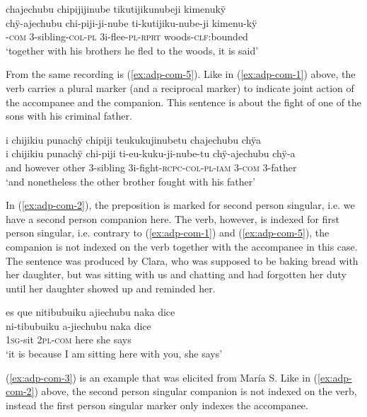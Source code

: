 \ea\label{ex:adp-com-1}
\begingl
\glpreamble chajechubu chipijijinube tikutijikunubeji kimenukÿ \\
\gla chÿ-ajechubu chi-piji-ji-nube ti-kutijiku-nube-ji kimenu-kÿ \\
-\textsc{com} 3-sibling-\textsc{col}-\textsc{pl} 3i-flee-\textsc{pl}-\textsc{rprt} woods-\textsc{clf:}bounded\\
\glft ‘together with his brothers he fled to the woods, it is said’
\endgl
\trailingcitation{[jxx-p120430l-2.087]}
\xe

From the same recording is (\ref{ex:adp-com-5}). Like in (\ref{ex:adp-com-1}) above, the verb carries a plural marker (and a reciprocal marker) to indicate joint action of the accompanee and the companion. This sentence is about the fight of one of the sons with his criminal father.

\newpage
\ea\label{ex:adp-com-5}
\begingl
\glpreamble i chijikiu punachÿ chipiji teukukujinubetu chajechubu chÿa\\
\gla i chijikiu punachÿ chi-piji ti-eu-kuku-ji-nube-tu chÿ-ajechubu chÿ-a\\
\glb and however other 3-sibling 3i-fight-\textsc{rcpc}-\textsc{col}-\textsc{pl}-\textsc{iam} 3-\textsc{com} 3-father\\
\glft ‘and nonetheless the other brother fought with his father’
\endgl
\trailingcitation{[jxx-p120430l-2.196]}
\xe

In (\ref{ex:adp-com-2}), the preposition is marked for second person singular, i.e. we have a second person companion here. The verb, however, is indexed for first person singular, i.e. contrary to (\ref{ex:adp-com-1}) and (\ref{ex:adp-com-5}), the companion is not indexed on the verb together with the accompanee in this case. The sentence was produced by Clara, who was supposed to be baking bread with her daughter, but was sitting with us and chatting and had forgotten her duty until her daughter showed up and reminded her.

\ea\label{ex:adp-com-2}
\begingl
\glpreamble es que nitibubuiku ajiechubu naka dice\\
 ni-tibubuiku a-jiechubu naka {dice}\\
 1\textsc{sg}-sit 2\textsc{pl}-\textsc{com} here {she says}\\
\glft ‘it is because I am sitting here with you, she says’
\endgl
\trailingcitation{[cux-120410ls.222]}
\xe

(\ref{ex:adp-com-3}) is an example that was elicited from María S. Like in (\ref{ex:adp-com-2}) above, the second person singular companion is not indexed on the verb, instead the first person singular marker only indexes the accompanee.

